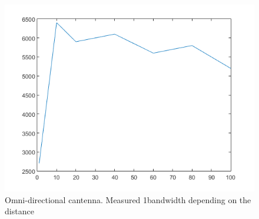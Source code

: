 \begin{figure}
\begin{center}
			
			\includegraphics[width=\figurewidth]{plots/omni_b.png}
			\caption{Omni-directional cantenna. Measured 1bandwidth depending on the distance}
			\label{img:dist:band:omni}
		\end{center}\end{figure}
		
